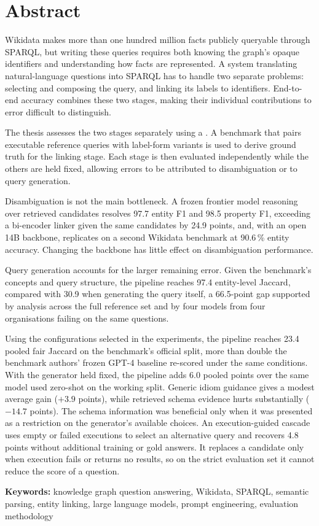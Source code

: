 \chapter*{Abstract}

Wikidata makes more than one hundred million facts publicly queryable through SPARQL, but writing these queries requires both knowing the graph's opaque identifiers and understanding how facts are represented.
A system translating natural-language questions into SPARQL has to handle two separate problems: selecting and composing the query, and linking its labels to identifiers.
End-to-end accuracy combines these two stages, making their individual contributions to error difficult to distinguish.

The thesis assesses the two stages separately using a \method{}.
A benchmark that pairs executable reference queries with label-form variants is used to derive ground truth for the linking stage.
Each stage is then evaluated independently while the others are held fixed, allowing errors to be attributed to disambiguation or to query generation.

Disambiguation is not the main bottleneck.
A frozen frontier model reasoning over retrieved candidates resolves 97.7 entity F1 and 98.5 property F1, exceeding a bi-encoder linker given the same candidates by 24.9 points, and, with an open 14B backbone, replicates on a second Wikidata benchmark at 90.6\,\% entity accuracy.
Changing the backbone has little effect on disambiguation performance.

Query generation accounts for the larger remaining error.
Given the benchmark's concepts and query structure, the pipeline reaches 97.4 entity-level Jaccard, compared with 30.9 when generating the query itself, a 66.5-point gap supported by analysis across the full reference set and by four models from four organisations failing on the same questions.

Using the configurations selected in the experiments, the pipeline reaches 23.4 pooled fair Jaccard on the benchmark's official split, more than double the benchmark authors' frozen GPT-4 baseline re-scored under the same conditions.
With the generator held fixed, the pipeline adds 6.0 pooled points over the same model used zero-shot on the working split.
Generic idiom guidance gives a modest average gain ($+3.9$ points), while retrieved schema evidence hurts substantially ($-14.7$ points). The schema information was beneficial only when it was presented as a restriction on the generator's available choices.
An execution-guided cascade uses empty or failed executions to select an alternative query and recovers 4.8 points without additional training or gold answers.
It replaces a candidate only when execution fails or returns no results, so on the strict evaluation set it cannot reduce the score of a question.

\vspace{1em}

\noindent\textbf{Keywords:} knowledge graph question answering, Wikidata, SPARQL,
semantic parsing, entity linking, large language models, prompt engineering, evaluation methodology
